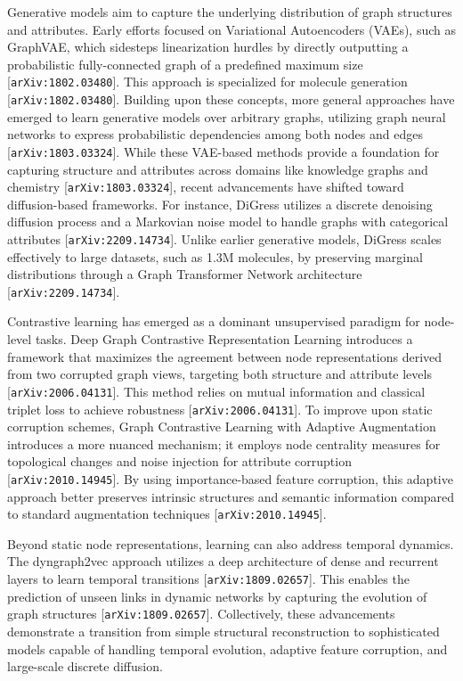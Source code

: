 \documentclass[11pt]{article}
\begin{document}
Generative models aim to capture the underlying distribution of graph structures and attributes. Early efforts focused on Variational Autoencoders (VAEs), such as GraphVAE, which sidesteps linearization hurdles by directly outputting a probabilistic fully-connected graph of a predefined maximum size [\texttt{arXiv:1802.03480}]. This approach is specialized for molecule generation [\texttt{arXiv:1802.03480}]. Building upon these concepts, more general approaches have emerged to learn generative models over arbitrary graphs, utilizing graph neural networks to express probabilistic dependencies among both nodes and edges [\texttt{arXiv:1803.03324}]. While these VAE-based methods provide a foundation for capturing structure and attributes across domains like knowledge graphs and chemistry [\texttt{arXiv:1803.03324}], recent advancements have shifted toward diffusion-based frameworks. For instance, DiGress utilizes a discrete denoising diffusion process and a Markovian noise model to handle graphs with categorical attributes [\texttt{arXiv:2209.14734}]. Unlike earlier generative models, DiGress scales effectively to large datasets, such as 1.3M molecules, by preserving marginal distributions through a Graph Transformer Network architecture [\texttt{arXiv:2209.14734}].

Contrastive learning has emerged as a dominant unsupervised paradigm for node-level tasks. Deep Graph Contrastive Representation Learning introduces a framework that maximizes the agreement between node representations derived from two corrupted graph views, targeting both structure and attribute levels [\texttt{arXiv:2006.04131}]. This method relies on mutual information and classical triplet loss to achieve robustness [\texttt{arXiv:2006.04131}]. To improve upon static corruption schemes, Graph Contrastive Learning with Adaptive Augmentation introduces a more nuanced mechanism; it employs node centrality measures for topological changes and noise injection for attribute corruption [\texttt{arXiv:2010.14945}]. By using importance-based feature corruption, this adaptive approach better preserves intrinsic structures and semantic information compared to standard augmentation techniques [\texttt{arXiv:2010.14945}].

Beyond static node representations, learning can also address temporal dynamics. The dyngraph2vec approach utilizes a deep architecture of dense and recurrent layers to learn temporal transitions [\texttt{arXiv:1809.02657}]. This enables the prediction of unseen links in dynamic networks by capturing the evolution of graph structures [\texttt{arXiv:1809.02657}]. Collectively, these advancements demonstrate a transition from simple structural reconstruction to sophisticated models capable of handling temporal evolution, adaptive feature corruption, and large-scale discrete diffusion.
\end{document}
